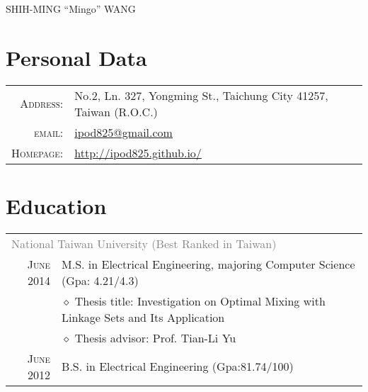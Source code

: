 \documentclass[a4paper,10pt]{article}
\begin{document}
\pagestyle{empty} %

\par{\centering
		{\Huge SHIH-MING ``Mingo'' WANG
	}\bigskip\par}

\section{Personal Data}

\begin{tabular}{rl}
    \textsc{Address:} & No.2, Ln. 327, Yongming St., Taichung City 41257, Taiwan (R.O.C.) \\
    \textsc{email:}     & \href{mailto:ipod825@gmail.com}{ipod825@gmail.com}\\
\textsc{Homepage:} & \href{http://ipod825.github.io/}{http://ipod825.github.io/}
    
\end{tabular}

\section{Education}
\begin{tabular}{r|l}	
\multicolumn{2}{l}{\textcolor{gray}{National Taiwan University (Best Ranked in Taiwan)}}\\
\textsc{June 2014}          & M.S. in Electrical Engineering, majoring Computer Science (Gpa: 4.21/4.3)\\
                            & $\diamond$ Thesis title: Investigation on Optimal Mixing with Linkage Sets and Its Application\\
                            & $\diamond$ Thesis advisor: Prof. Tian-Li Yu\\
\textsc{June 2012}          & B.S. in Electrical Engineering (Gpa:81.74/100)\\       
\end{tabular}
\end{document}

